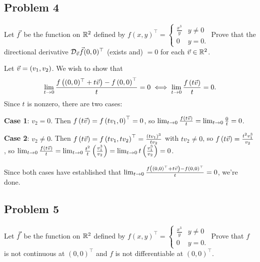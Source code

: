 \documentclass[main.tex]{subfiles}
\begin{document}
\subsection{Problem 4}
\begin{claim}
    Let $\vec{f}$ be the function on $\mathbb R^2$ defined by $f(x, y)^\top = \begin{cases}
        \frac{x^3}{y} & y\neq 0 \\
        0 & y = 0.
    \end{cases}$ Prove that the directional derivative $\mathcal{D}_{\vec{v}}\vec{f} (0, 0)^\top$ (exists and) $= 0$ for each $\vec{v} \in \mathbb R^2$.
\end{claim}

\begin{soln}
    Let $\vec{v} = \left( v_1, v_2 \right)$. We wish to show that 
    \[\lim_{t\to 0} \frac{f\left( (0, 0)^\top + t\vec{v} \right) - f\left( 0, 0 \right)^\top}{t} = 0 \iff \lim_{t\to 0} \frac{f\left( t\vec{v} \right)}{t} = 0.\]
    Since $t$ is nonzero, there are two cases:

    \textbf{Case 1}: $v_2 = 0$. Then $f\left( t\vec{v} \right) = f\left( tv_1, 0 \right)^\top = 0$, so $\lim_{t\to 0} \frac{f\left( t\vec{v} \right)}{t} = \lim_{t\to 0} \frac{0}{t} = 0$.

    \textbf{Case 2}: $v_2 \neq 0$. Then $f\left( t\vec{v} \right) = f\left( tv_1, tv_2 \right)^\top = \frac{(tv_1)^3}{tv_2}$ with $tv_2 \neq 0$, so $f\left( t\vec{v} \right) = \frac{t^2v_1^3}{v_2}$, so $\lim_{t\to 0} \frac{f\left( t\vec{v} \right)}{t} = \lim_{t\to 0} \frac{t^2}{t}\left( \frac{v_1^3}{v_2} \right) = \lim_{t\to 0} t\left( \frac{v_1^3}{v_2} \right) = 0$.

    Since both cases have established that $\lim_{t\to 0} \frac{f\left( (0, 0)^\top + t\vec{v} \right) - f\left( 0, 0 \right)^\top}{t} = 0$, we're done.
\end{soln}
\eject

\subsection{Problem 5}
\begin{claim}
    Let $\vec{f}$ be the function on $\mathbb R^2$ defined by $f(x, y)^\top = \begin{cases}
        \frac{x^3}{y} & y\neq 0 \\
        0 & y = 0.
    \end{cases}$ Prove that $f$ is not continuous at $(0, 0)^\top$ and $f$ is not differentiable at $(0, 0)^\top$.
\end{claim}
\end{document}
